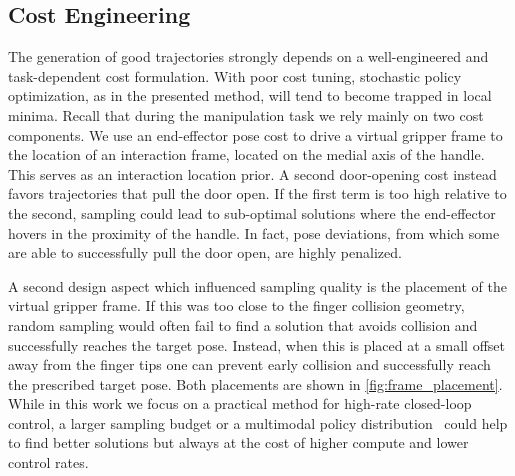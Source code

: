\subsection{Cost Engineering}
The generation of good trajectories strongly depends on a well-engineered and task-dependent cost formulation. With poor cost tuning, stochastic policy optimization, as in the presented method, will tend to become trapped in local minima. Recall that during the manipulation task we rely mainly on two cost components. We use an end-effector pose cost to drive a virtual gripper frame to the location of an interaction frame, located on the medial axis of the handle. This serves as an interaction location prior. A second door-opening cost instead favors trajectories that pull the door open. If the first term is too high relative to the second, sampling could lead to sub-optimal solutions where the end-effector hovers in the proximity of the handle. In fact, pose deviations, from which some are able to successfully pull the door open, are highly penalized.

A second design aspect which influenced sampling quality is the placement of the virtual gripper frame. If this was too close to the finger collision geometry, random sampling would often fail to find a solution that avoids collision and successfully reaches the target pose. Instead, when this is placed at a small offset away from the finger tips one can prevent early collision and successfully reach the prescribed target pose. Both placements are shown in \fig \ref{fig:frame_placement}. While in this work we focus on a practical method for high-rate closed-loop control, a larger sampling budget or a multimodal policy distribution~\cite{lambert_stein_2020} could help to find better solutions but always at the cost of higher compute and lower control rates.

